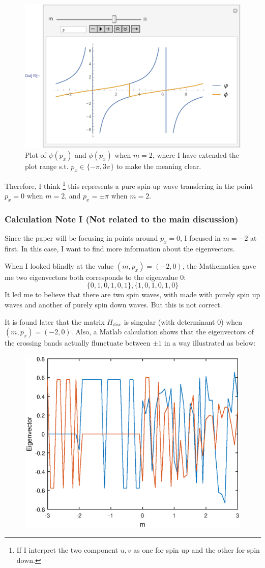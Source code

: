 \documentclass{article}
\begin{document}
\begin{figure}[H]
    \centering
    \includegraphics[width=0.6\linewidth]{pics/upperSpinWaveM2.pdf}
    \caption{Plot of $\psi(p_x)$ and $\phi(p_x)$ when $m=2$, where I
    have extended the plot range s.t. $p_x\in\{-\pi,3\pi\}$ to make the
    meaning clear.}
\end{figure}

Therefore, I think
\footnote{If I interpret the two component $u,v$ as one for spin up
and the other for spin down.} 
this represents a pure spin-up wave transfering in the point $p_x=0$
when $m=2$, and $p_x=\pm\pi$ when $m=2$.


    \subsubsection{Calculation Note I (Not related to the main discussion)}

Since the paper will be focusing in points around $p_x=0$, I focused
in $m=-2$ at first. In this case, I want to find more information
about the eigenvectors. 

When I looked blindly at the value $(m,p_x)=(-2,0)$, the
Mathematica gave me two eigenvectors both corresponds to the
eigenvalue $0$:
\begin{equation}
    \{0,1,0,1,0,1\},\{1,0,1,0,1,0\}
\end{equation}
It led me to believe that there are two spin waves, with made with
purely spin up waves and another of purely spin down waves. But
this is not correct. 

It is found later that the matrix $H_\text{disc}$ is singular
(with determinant $0$) when $(m,p_x)=(-2,0)$. Also, a Matlab
calculation shows that the eigenvectors of the crossing bands
actually flunctuate between $\pm 1$ in a way illustrated as below:
\begin{figure}[H]
    \centering
    \includegraphics[width=0.6\linewidth]{pics/Eigenvector-m.eps}
\end{figure}
\end{document}
